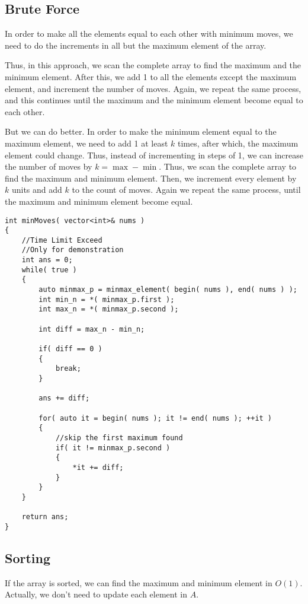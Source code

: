 \subsection{Brute Force}
In order to make all the elements equal to each other with minimum moves, we need to do the increments in all but the maximum element of the array. 

Thus, in this approach, we scan the complete array to find the maximum and the minimum element. After this, we add 1 to all the elements except the maximum element, and increment the number of moves. Again, we repeat the same process, and this continues until the maximum and the minimum element become equal to each other.

But we can do better. In order to make the minimum element equal to the maximum element, we need to add 1 at least $k$ times, after which, the maximum element could change. Thus, instead of incrementing in steps of 1, we can increase the number of moves by $ k=\max-\min$. Thus, we scan the complete array to find the maximum and minimum element. Then, we increment every element by $k$ units and add $k$ to the count of moves. Again we repeat the same process, until the maximum and minimum element become equal.

\begin{lstlisting}[style=customc, caption={Better Brute Force}]
int minMoves( vector<int>& nums )
{
    //Time Limit Exceed
    //Only for demonstration
    int ans = 0;
    while( true )
    {
        auto minmax_p = minmax_element( begin( nums ), end( nums ) );
        int min_n = *( minmax_p.first );
        int max_n = *( minmax_p.second );

        int diff = max_n - min_n;

        if( diff == 0 )
        {
            break;
        }

        ans += diff;

        for( auto it = begin( nums ); it != end( nums ); ++it )
        {
            //skip the first maximum found
            if( it != minmax_p.second )
            {
                *it += diff;
            }
        }
    }

    return ans;
}
\end{lstlisting}

\subsection{Sorting}
If the array is sorted, we can find the maximum and minimum element in $O(1)$. Actually, we don't need to update each element in $A$.

